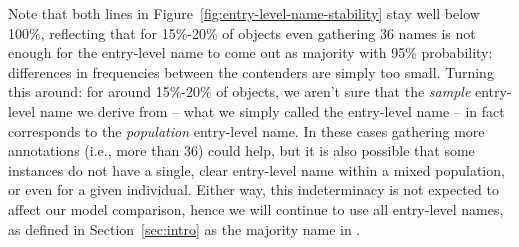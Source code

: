 Note that both lines in Figure~\ref{fig:entry-level-name-stability} stay well below 100\%, reflecting that for 15\%-20\% of objects even gathering 36 names is not enough for the entry-level name to come out as majority with 95\% probability: differences in frequencies between the contenders are simply too small.
Turning this around: for around 15\%-20\% of objects, we aren't sure that the \emph{sample} entry-level name we derive from \mn -- what we simply called the entry-level name -- in fact corresponds to the \emph{population} entry-level name.
In these cases gathering more annotations (i.e., more than 36) could help, but it is also possible that some instances do not have a single, clear entry-level name within a mixed population, or even for a given individual.
Either way, this indeterminacy is not expected to affect our model comparison, hence we will continue to use all entry-level names, as defined in Section~\ref{sec:intro} as the majority name in \mn.

  




